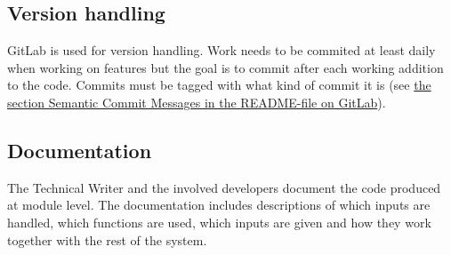 \subsection{Version handling}
GitLab is used for version handling. Work needs to be commited at least daily when working on features but the goal is to commit after each working addition to the code. Commits must be tagged with what kind of commit it is (see \href{https://gitlab.liu.se/tddc88-company-1-2021/deploy/-/blob/develop/README.md}{the section Semantic Commit Messages in the README-file on GitLab}).

\subsection{Documentation}
The Technical Writer and the involved developers document the code produced at module level. The documentation includes descriptions of which inputs are handled, which functions are used, which inputs are given and how they work together with the rest of the system.
